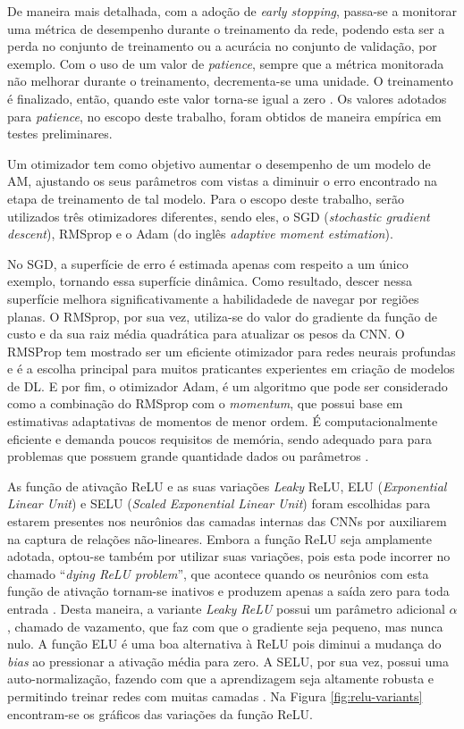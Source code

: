 De maneira mais detalhada, com a adoção de \emph{early stopping}, passa-se a monitorar uma métrica de desempenho durante o treinamento da rede, podendo esta ser a perda no conjunto de treinamento ou a acurácia no conjunto de validação, por exemplo. Com o uso de um valor de \emph{patience}, sempre que a métrica monitorada não melhorar durante o treinamento, decrementa-se uma unidade. O treinamento é finalizado, então, quando este valor torna-se igual a zero \cite{chollet}. Os valores adotados para \emph{patience}, no escopo deste trabalho, foram obtidos de maneira empírica em testes preliminares.

Um otimizador tem como objetivo aumentar o desempenho de um modelo de AM, ajustando os seus parâmetros com vistas a diminuir o erro encontrado na etapa de treinamento de tal modelo. Para o escopo deste trabalho, serão utilizados três otimizadores diferentes, sendo eles, o SGD (\emph{stochastic gradient descent}), RMSprop e o Adam (do inglês \emph{adaptive moment estimation}).

No SGD, a superfície de erro é estimada apenas com respeito a um único exemplo, tornando essa superfície dinâmica. Como resultado, descer nessa superfície melhora significativamente a habilidadede de navegar por regiões planas. O RMSprop, por sua vez, utiliza-se do valor do gradiente da função de custo e da sua raiz média quadrática para atualizar os pesos da CNN. O RMSProp tem mostrado ser um eficiente otimizador para redes neurais profundas e é a escolha principal para muitos praticantes experientes em criação de modelos de DL. E por fim, o otimizador Adam, é um algoritmo que pode ser considerado como a combinação do RMSprop com o \emph{momentum}, que possui base em estimativas adaptativas de momentos de menor ordem. É computacionalmente eficiente e demanda poucos requisitos de memória, sendo adequado para para problemas que possuem grande quantidade dados ou parâmetros \cite{buduma, rmsprop, adam}.

As função de ativação ReLU e as suas variações \emph{Leaky} ReLU, ELU (\emph{Exponential Linear Unit}) e SELU (\emph{Scaled Exponential Linear Unit}) foram escolhidas para estarem presentes nos neurônios das camadas internas das CNNs por auxiliarem na captura de relações não-lineares. Embora a função ReLU seja amplamente adotada, optou-se também por utilizar suas variações, pois esta pode incorrer no chamado ``\emph{dying ReLU problem}'', que acontece quando os neurônios com esta função de ativação tornam-se inativos e produzem apenas a saída zero para toda entrada \cite{reluDying}.  Desta maneira, a variante \emph{Leaky ReLU} possui um parâmetro adicional $\alpha$, chamado de vazamento, que faz com que o gradiente seja pequeno, mas nunca nulo. A função ELU é uma boa alternativa à ReLU pois diminui a mudança do \emph{bias} ao pressionar a ativação média para zero. A SELU, por sua vez, possui uma auto-normalização, fazendo com que a aprendizagem seja altamente robusta e permitindo treinar redes com muitas camadas \cite{relu}. Na Figura \ref{fig:relu-variants} encontram-se os gráficos das variações da função ReLU.

